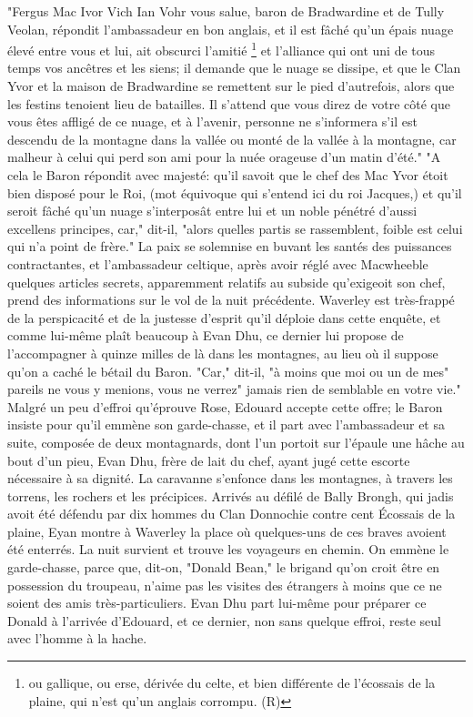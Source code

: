 "Fergus Mac Ivor Vich Ian Vohr vous salue, baron de Bradwardine et de Tully Veolan, répondit l'ambassadeur en bon anglais, et il est fâché qu'un épais nuage élevé entre vous et lui, ait obscurci l'amitié \footnote{ou gallique, ou erse, dérivée du celte, et bien différente de l'écossais de la plaine, qui n'est qu'un anglais corrompu. (R)}\setcounter{page}{102} et l'alliance qui ont uni de tous temps vos ancêtres et les siens; il demande que le nuage se dissipe, et que le Clan Yvor et la maison de Bradwardine se remettent sur le pied d'autrefois, alors que les festins tenoient lieu de batailles. Il s'attend que vous direz de votre côté que vous êtes affligé de ce nuage, et à l'avenir, personne ne s'informera s'il est descendu de la montagne dans la vallée ou monté de la vallée à la montagne, car malheur à celui qui perd son ami pour la nuée orageuse d'un matin d'été."
"A cela le Baron répondit avec majesté: qu'il savoit que le chef des Mac Yvor étoit bien disposé pour le Roi, (mot équivoque qui s'entend ici du roi Jacques,) et qu'il seroit fâché qu'un nuage s'interposât entre lui et un noble pénétré d'aussi excellens principes, car," dit-il, "alors quelles partis se rassemblent, foible est celui qui n'a point de frère."
La paix se solemnise en buvant les santés des puissances contractantes, et l'ambassadeur celtique, après avoir réglé avec Macwheeble quelques articles secrets, apparemment relatifs au subside qu'exigeoit son chef, prend des informations sur le vol de la nuit précédente.\setcounter{page}{103} Waverley est très-frappé de la perspicacité et de la justesse d'esprit qu'il déploie dans cette enquête, et comme lui-même plaît beaucoup à Evan Dhu, ce dernier lui propose de l'accompagner à quinze milles de là dans les montagnes, au lieu où il suppose qu'on a caché le bétail du Baron. "Car," dit-il, "à moins que moi ou un de mes" pareils ne vous y menions, vous ne verrez" jamais rien de semblable en votre vie."
Malgré un peu d'effroi qu'éprouve Rose, Edouard accepte cette offre; le Baron insiste pour qu'il emmène son garde-chasse, et il part avec l'ambassadeur et sa suite, composée de deux montagnards, dont l'un portoit sur l'épaule une hâche au bout d'un pieu, Evan Dhu, frère de lait du chef, ayant jugé cette escorte nécessaire à sa dignité.
La caravanne s'enfonce dans les montagnes, à travers les torrens, les rochers et les précipices. Arrivés au défilé de Bally Brongh, qui jadis avoit été défendu par dix hommes du Clan Donnochie contre cent Écossais de la plaine, Eyan montre à Waverley la place où quelques-uns de ces braves avoient été enterrés. La nuit survient et trouve les voyageurs en chemin. On emmène le garde-chasse, parce que, dit-on, "Donald Bean," le brigand\setcounter{page}{104} qu'on croit être en possession du troupeau, n'aime pas les visites des étrangers à moins que ce ne soient des amis très-particuliers. Evan Dhu part lui-même pour préparer ce Donald à l'arrivée d'Edouard, et ce dernier, non sans quelque effroi, reste seul avec l'homme à la hache.
